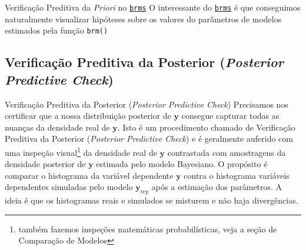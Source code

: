 \begin{frame}{Verificação Preditiva da \textit{Priori} no \href{https://paul-buerkner.github.io/brms/}{\texttt{brms}}}
    O interessante do \href{https://paul-buerkner.github.io/brms/}{\texttt{brms}} é
    que conseguimos naturalmente visualizar hipóteses sobre os valores do parâmetros de modelos
    estimados pela função \lstinline!brm()!
    \begin{figure}
    \centering
        \resizebox{.35\linewidth}{!}{}
    \end{figure}
\end{frame}

\subsection{Verificação Preditiva da Posterior (\textit{Posterior Predictive Check})}
\begin{frame}{Verificação Preditiva da Posterior (\textit{Posterior Predictive Check})}
    Precisamos nos certificar que a nossa distribuição posterior de $\boldsymbol{y}$
    consegue capturar todas as nuanças da densidade real de $\boldsymbol{y}$.
    \vfill
    Isto é um procedimento chamado de Verificação Preditiva da Posterior
    (\textit{Posterior Predictive Check}) e é geralmente auferido com uma inspeção
    visual\footnote{também fazemos inspeções matemáticas probabilísticas,
    veja a seção de Comparação de Modelos} da densidade real de $\boldsymbol{y}$
    contrastada com amostragens da densidade
    posterior de $\boldsymbol{y}$ estimada pelo modelo Bayesiano.
    \vfill
    O propósito é comparar o histograma da variável dependente $\boldsymbol{y}$ contra o histograma variáveis dependentes simuladas
    pelo modelo $\boldsymbol{y}_{\text{rep}}$ após a estimação dos parâmetros. A ideia é
    que os histogramas reais e simulados se misturem e não haja divergências.
\end{frame}

